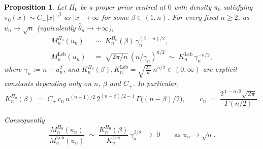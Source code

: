 \documentclass{article}%
\newtheorem{proposition}[theorem]{Proposition}
\newcommand{\Leb}{\mathrm{Leb}}
\newcommand{\1}{\mathbf{1}}
\begin{document}
\begin{proposition}\label{prop:rate-mismatch}
Let \(\Pi_0\) be a proper prior centred at \(0\) with density
\(\pi_0\) satisfying
\(\pi_0(x)\sim C_+|x|^{-\beta}\) as \(|x|\to\infty\)
for some \(\beta\in(1,n)\). For every fixed \(n\geq 2\), as
\(u_n\to\sqrt n\) (equivalently \(\widehat\theta_n\to+\infty\)),
\begin{align}
   M_n^{\Pi_0}(u_n) &\;\sim\;
       K_n^{\Pi_0}(\beta)\,\gamma_n^{(\beta-n)/2},
       \label{eq:Mn-rate}\\[2pt]
   M_n^{\Leb}(u_n) &\;=\;
       \sqrt{2\pi/n}\,(n/\gamma_n)^{n/2}
       \;\sim\;K_n^{\Leb}\,\gamma_n^{-n/2},
       \label{eq:Mleb-rate}
\end{align}
where \(\gamma_n:=n-u_n^2\), and
\(K_n^{\Pi_0}(\beta), K_n^{\Leb} = \sqrt{\frac{2\pi}{n}} \, n^{n/2} \in(0,\infty)\) are explicit
constants depending only on \(n\), \(\beta\) and \(C_+\). In
particular,
\[
  K_n^{\Pi_0}(\beta) \;=\; C_+\, c_n\, n^{(n-1)/2}\, 2^{(n-\beta)/2-1}\, 
\Gamma\!\bigl((n-\beta)/2\bigr),
\qquad
c_n \;=\; \frac{2^{\,1-n/2}\sqrt{2\pi}}{\Gamma(n/2)}.
\]

Consequently
\begin{equation}\label{eq:rate-mismatch}
   \frac{M_n^{\Pi_0}(u_n)}{M_n^{\Leb}(u_n)}
   \;\sim\;\frac{K_n^{\Pi_0}(\beta)}{K_n^{\Leb}}\,\gamma_n^{\beta/2}
   \;\longrightarrow\;0\qquad\text{as }u_n\to\sqrt n.
\end{equation}
\end{proposition}
\end{document}
